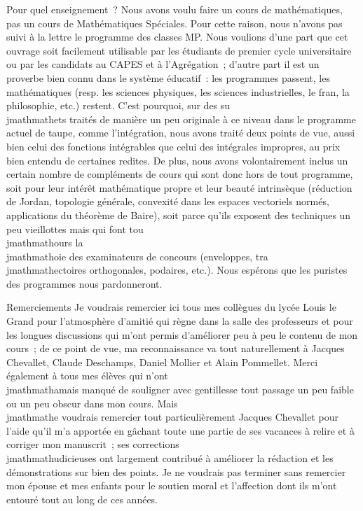 \documentclass[]{article}
\begin{document}
Pour quel enseignement~? Nous avons voulu faire un cours de
mathématiques, pas un cours de Mathématiques Spéciales. Pour cette
raison, nous n'avons pas suivi à la lettre le programme des classes MP.
Nous voulions d'une part que cet ouvrage soit facilement utilisable par
les étudiants de premier cycle universitaire ou par les candidats au
CAPES et à l'Agrégation~; d'autre part il est un proverbe bien connu
dans le système éducatif~: les programmes passent, les mathématiques
(resp. les sciences physiques, les sciences industrielles, le
fran\ccais, la philosophie, etc.) restent. C'est
pourquoi, sur des su\\jmathmathets traités de manière un peu originale à ce niveau
dans le programme actuel de taupe, comme l'intégration, nous avons
traité deux points de vue, aussi bien celui des fonctions intégrables
que celui des intégrales impropres, au prix bien entendu de certaines
redites. De plus, nous avons volontairement inclus un certain nombre de
compléments de cours qui sont donc hors de tout programme, soit pour
leur intérêt mathématique propre et leur beauté intrinsèque (réduction
de Jordan, topologie générale, convexité dans les espaces vectoriels
normés, applications du théorème de Baire), soit parce qu'ils exposent
des techniques un peu vieillottes mais qui font tou\\jmathmathours la \\jmathmathoie des
examinateurs de concours (enveloppes, tra\\jmathmathectoires orthogonales,
podaires, etc.). Nous espérons que les puristes des programmes nous
pardonneront.

Remerciements Je voudrais remercier ici tous mes collègues du lycée
Louis le Grand pour l'atmosphère d'amitié qui règne dans la salle des
professeurs et pour les longues discussions qui m'ont permis d'améliorer
peu à peu le contenu de mon cours~; de ce point de vue, ma
reconnaissance va tout naturellement à Jacques Chevallet, Claude
Deschamps, Daniel Mollier et Alain Pommellet. Merci également à tous mes
élèves qui n'ont \\jmathmathamais manqué de souligner avec gentillesse tout
passage un peu faible ou un peu obscur dans mon cours. Mais \\jmathmathe voudrais
remercier tout particulièrement Jacques Chevallet pour l'aide qu'il m'a
apportée en gâchant toute une partie de ses vacances à relire et à
corriger mon manuscrit~; ses corrections \\jmathmathudicieuses ont largement
contribué à améliorer la rédaction et les démonstrations sur bien des
points. Je ne voudrais pas terminer sans remercier mon épouse et mes
enfants pour le soutien moral et l'affection dont ils m'ont entouré tout
au long de ces années.
\end{document}
